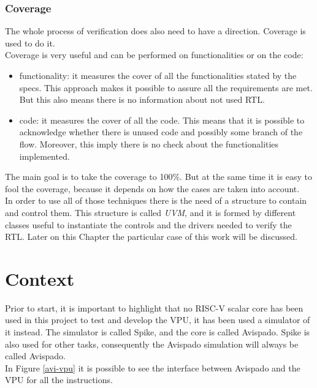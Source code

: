 \bigskip

\subsubsection{Coverage}
The whole process of verification does also need to have a direction. Coverage is used to do it. \\

Coverage is very useful and can be performed on functionalities or on the code:
\begin{itemize}
    \item functionality: it measures the cover of all the functionalities stated by the specs. This approach makes it possible to assure all the requirements are met. But this also means there is no information about not used RTL.
    
    \item code: it measures the cover of all the code. This means that it is possible to acknowledge whether there is unused code and possibly some branch of the flow. Moreover, this imply there is no check about the functionalities implemented.

\end{itemize}

The main goal is to take the coverage to 100\%. But at the same time it is easy to fool the coverage, because it depends on how the cases are taken into account. \\

In order to use all of those techniques there is the need of a structure to contain and control them.
This structure is called \textit{UVM}, and it is formed by different classes useful to instantiate the controls and the drivers needed to verify the RTL. Later on this Chapter the particular case of this work will be discussed.

\section{Context}
Prior to start, it is important to highlight that no RISC-V scalar core has been used in this project to test and develop the VPU, it has been used a simulator of it instead. The simulator is called Spike, and the core is called Avispado. Spike is also used for other tasks, consequently the Avispado simulation will always be called Avispado.\\
In Figure \ref{avi-vpu} it is possible to see the interface between Avispado and the VPU for all the instructions.\\

